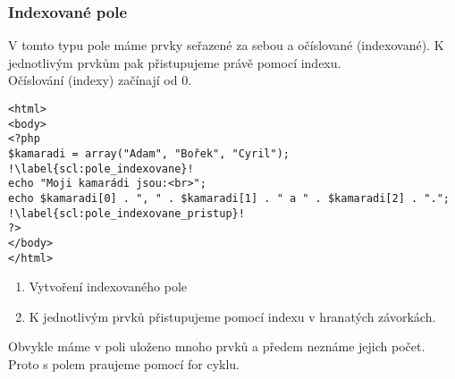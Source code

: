 \subsubsection{Indexované pole}
V tomto typu pole máme prvky seřazené za sebou a očíslované (indexované). K jednotlivým prvkům pak přistupujeme právě pomocí indexu.\\
Očíslování (indexy) začínají od 0.\\

\begin{minipage}[t]{.45\textwidth}
\begin{code}
\begin{verbatim}
<html>
<body>
<?php
$kamaradi = array("Adam", "Bořek", "Cyril"); !\label{scl:pole_indexovane}!
echo "Moji kamarádi jsou:<br>";
echo $kamaradi[0] . ", " . $kamaradi[1] . " a " . $kamaradi[2] . "."; !\label{scl:pole_indexovane_pristup}!
?> 
</body>
</html> 
\end{verbatim}

\label{code:php_pole_index}
\end{code}
\end{minipage}
\begin{minipage}[t]{.45\textwidth}
\vspace{2.3cm}
\begin{enumerate}
\item[ř. \ref{scl:pole_indexovane}:] Vytvoření indexovaného pole
\item[ř. \ref{scl:pole_indexovane_pristup}:] K jednotlivým prvků přistupujeme pomocí indexu v hranatých závorkách.
\end{enumerate}
\end{minipage} 

Obvykle máme v poli uloženo mnoho prvků a předem neznáme jejich počet. Proto s polem praujeme pomocí for cyklu.\\

